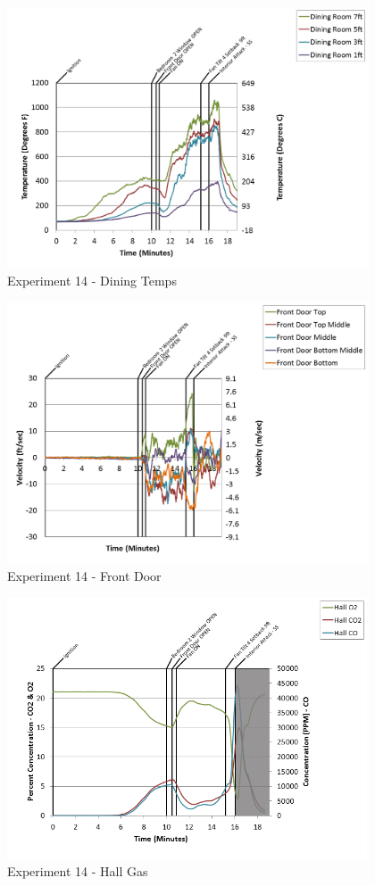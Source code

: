 \documentclass{article}
\begin{document}
\begin{appendices}
\begin{figure}[h!]
	\centering
	\includegraphics[height=3.05in]{0_Images/Results_Charts/Exp_14_Charts/DiningTemps.png}
	\caption{Experiment 14 - Dining Temps}
\end{figure}

\clearpage

\begin{figure}[h!]
	\centering
	\includegraphics[height=3.05in]{0_Images/Results_Charts/Exp_14_Charts/FrontDoor.png}
	\caption{Experiment 14 - Front Door}
\end{figure}


\begin{figure}[h!]
	\centering
	\includegraphics[height=3.05in]{0_Images/Results_Charts/Exp_14_Charts/HallGas.png}
	\caption{Experiment 14 - Hall Gas}
\end{figure}


\end{appendices}
\end{document}
